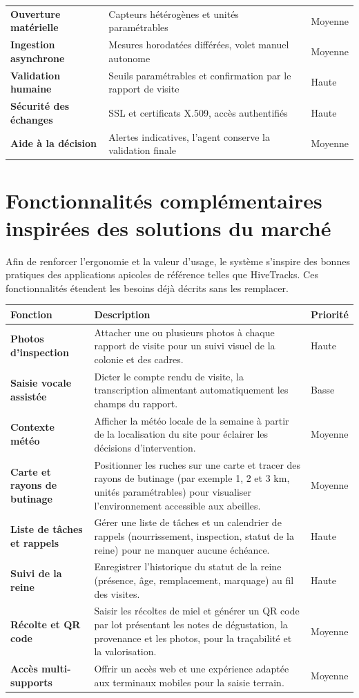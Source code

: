 \begin{xltabular}{\textwidth}{>{\bfseries}p{3.4cm} X C{2.2cm}}
Ouverture matérielle & Capteurs hétérogènes et unités paramétrables & Moyenne \\
Ingestion asynchrone & Mesures horodatées différées, volet manuel autonome & Moyenne \\
Validation humaine & Seuils paramétrables et confirmation par le rapport de visite & Haute \\
Sécurité des échanges & SSL et certificats X.509, accès authentifiés & Haute \\
Aide à la décision & Alertes indicatives, l'agent conserve la validation finale & Moyenne \\
\bottomrule
\end{xltabular}

\section{Fonctionnalités complémentaires inspirées des solutions du marché}
Afin de renforcer l'ergonomie et la valeur d'usage, le système s'inspire des
bonnes pratiques des applications apicoles de référence telles que HiveTracks.
Ces fonctionnalités étendent les besoins déjà décrits sans les remplacer.
\begin{xltabular}{\textwidth}{>{\bfseries}p{4.2cm} X C{2.1cm}}
\toprule
\textbf{Fonction} & \textbf{Description} & \textbf{Priorité} \\
\midrule
\endhead
Photos d'inspection & Attacher une ou plusieurs photos à chaque rapport de visite pour un suivi visuel de la colonie et des cadres. & Haute \\
Saisie vocale assistée & Dicter le compte rendu de visite, la transcription alimentant automatiquement les champs du rapport. & Basse \\
Contexte météo & Afficher la météo locale de la semaine à partir de la localisation du site pour éclairer les décisions d'intervention. & Moyenne \\
Carte et rayons de butinage & Positionner les ruches sur une carte et tracer des rayons de butinage (par exemple 1, 2 et 3 km, unités paramétrables) pour visualiser l'environnement accessible aux abeilles. & Moyenne \\
Liste de tâches et rappels & Gérer une liste de tâches et un calendrier de rappels (nourrissement, inspection, statut de la reine) pour ne manquer aucune échéance. & Haute \\
Suivi de la reine & Enregistrer l'historique du statut de la reine (présence, âge, remplacement, marquage) au fil des visites. & Haute \\
Récolte et QR code & Saisir les récoltes de miel et générer un QR code par lot présentant les notes de dégustation, la provenance et les photos, pour la traçabilité et la valorisation. & Moyenne \\
Accès multi-supports & Offrir un accès web et une expérience adaptée aux terminaux mobiles pour la saisie terrain. & Moyenne \\
\bottomrule
\end{xltabular}
